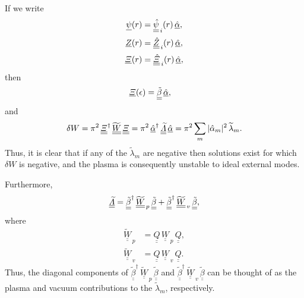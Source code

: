 \documentclass[12pt,prb,aps,notitlepage]{revtex4-1}
\begin{document}
If we write
\begin{align}
\underline{\psi}(r)&= \underline{\underline{\hat{\psi}}}_{\,i}(r)\,\underline{\hat{\alpha}},\\[0.5ex]
\underline{Z}(r)&= \underline{\underline{\hat{Z}}}_{\,i}(r)\,\underline{\hat{\alpha}},\\[0.5ex]
\underline{{\mit\Xi}}(r)&= \underline{\underline{\hat{\mit\Xi}}}_{\,i}(r)\,\underline{\hat{\alpha}},
\end{align}
then
\begin{align}
\underline{{\mit\Xi}}(\epsilon) &=\underline{\underline{\tilde{\beta}}}\,\underline{\hat{\alpha}},
\end{align}
and 
\begin{equation}
 \delta W=\pi^2\, \underline{\underline{\mit\Xi}}^\dag\,\underline{\underline{\widetilde{W}}}\,\underline{\underline{{\mit\Xi}}}=\pi^2\,\underline{\hat{\alpha}}^\dag\,\underline{\underline{\widetilde{\mit\Lambda}}}\,\underline{\hat{\alpha}}= \pi^2\sum_m |\hat{\alpha}_m|^2\,\widetilde{\lambda}_m.
 \end{equation}
Thus, it is clear that if any of the $\widetilde{\lambda}_m$ are negative then solutions exist for which $\delta W$ is negative, and the plasma
is consequently unstable to ideal external modes. 

 Furthermore,
\begin{equation}
\underline{\underline{\widetilde{\mit\Lambda}}}=\underline{\underline{\tilde{\beta}}}^\dag\,\underline{\underline{\widetilde{W}}}_{\,p}\,\underline{\underline{\tilde{\beta}}}
+\underline{\underline{\tilde{\beta}}}^\dag\,\underline{\underline{\widetilde{W}}}_{\,v}\,\underline{\underline{\tilde{\beta}}},
\end{equation}
where
\begin{align}
\underline{\underline{\widetilde{W}}}_{\,p}&= \underline{\underline{Q}}\,\underline{\underline{W}}_{\,p}\,\underline{\underline{Q}},\\[0.5ex]
\underline{\underline{\widetilde{W}}}_{\,v}&= \underline{\underline{Q}}\,\underline{\underline{W}}_{\,v}\,\underline{\underline{Q}}.
\end{align}
Thus, the diagonal components of $\underline{\underline{\tilde{\beta}}}^\dag\,\underline{\underline{\widetilde{W}}}_{\,p}\,\underline{\underline{\tilde{\beta}}}$ and 
$\underline{\underline{\tilde{\beta}}}^\dag\,\underline{\underline{\widetilde{W}}}_{\,v}\,\underline{\underline{\tilde{\beta}}}$ can be thought of as the
plasma and vacuum contributions to the $\widetilde{\lambda}_m$, respectively. 
\end{document}
